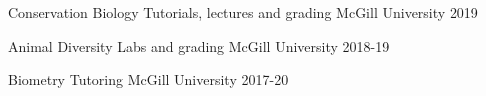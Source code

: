 \begin{cvhonors}

      \cvhonor
        {Conservation Biology} %
        {Tutorials, lectures and grading} %
        {McGill University} %
        {2019} %
    
      \cvhonor
        {Animal Diversity} %
        {Labs and grading} %
        {McGill University} %
        {2018-19} %
    
    \cvhonor
        {Biometry} %
        {Tutoring} %
        {McGill University} %
        {2017-20} %

\end{cvhonors}
    